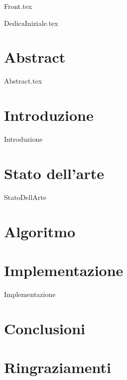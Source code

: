 \documentclass[12pt,onesidet]{report}
\begin{document}
	
	\begin{titlepage}
		{Front.tex}
	\end{titlepage}

	{DedicaIniziale.tex}
    
    
    \chapter*{Abstract}
    {Abstract.tex}
    
    \tableofcontents{}
    \listoftables
    \listoflistings
    \newpage
    
    
    \chapter{Introduzione}
    {Introduzione}
    
    \chapter{Stato dell'arte}
    {StatoDellArte}
    
    \chapter{Algoritmo}
    
    \chapter{Implementazione}
    {Implementazione}
    
    \chapter{Conclusioni}
    
    \chapter{Ringraziamenti}
    
     
    
    
\end{document}
